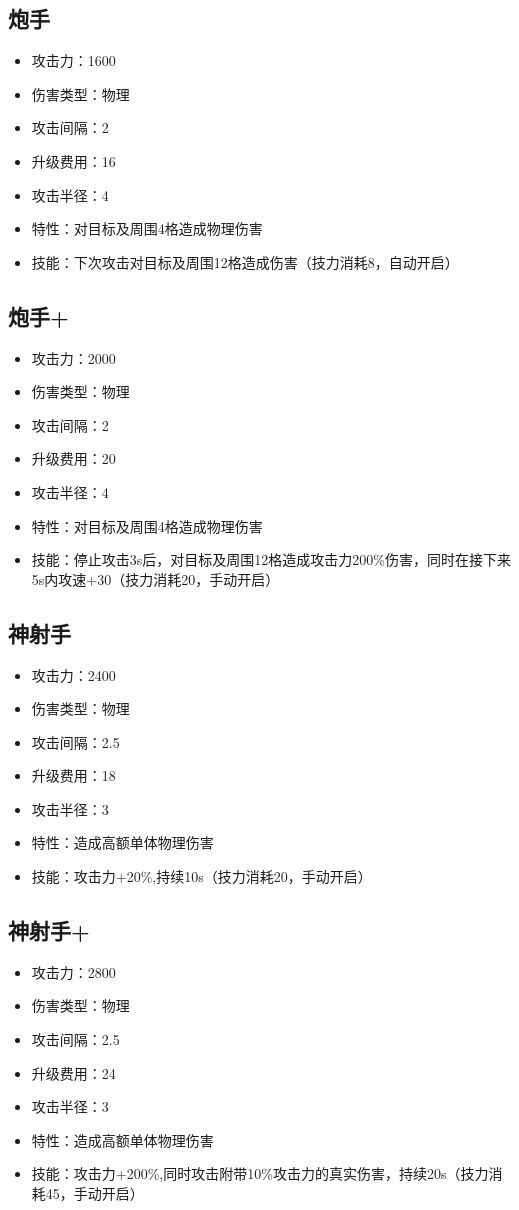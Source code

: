 \documentclass[a4paper,12pt]{article}
\begin{document}
		\subsection{炮手}
			\begin{itemize}
				\item 攻击力：1600
				\item 伤害类型：物理
				\item 攻击间隔：2
				\item 升级费用：16
				\item 攻击半径：4
				\item 特性：对目标及周围4格造成物理伤害
				\item 技能：下次攻击对目标及周围12格造成伤害（技力消耗8，自动开启）
			\end{itemize}
		\subsection{炮手+}
			\begin{itemize}
				\item 攻击力：2000
				\item 伤害类型：物理
				\item 攻击间隔：2
				\item 升级费用：20
				\item 攻击半径：4
				\item 特性：对目标及周围4格造成物理伤害
				\item 技能：停止攻击3s后，对目标及周围12格造成攻击力200\%伤害，同时在接下来5s内攻速+30（技力消耗20，手动开启）
			\end{itemize}
		\subsection{神射手}
			\begin{itemize}
				\item 攻击力：2400
				\item 伤害类型：物理
				\item 攻击间隔：2.5
				\item 升级费用：18
				\item 攻击半径：3
				\item 特性：造成高额单体物理伤害
				\item 技能：攻击力+20\%,持续10s（技力消耗20，手动开启）
			\end{itemize}
		\subsection{神射手+}
			\begin{itemize}
				\item 攻击力：2800
				\item 伤害类型：物理
				\item 攻击间隔：2.5
				\item 升级费用：24
				\item 攻击半径：3
				\item 特性：造成高额单体物理伤害
				\item 技能：攻击力+200\%,同时攻击附带10\%攻击力的真实伤害，持续20s（技力消耗45，手动开启）
			\end{itemize}
\end{document}

